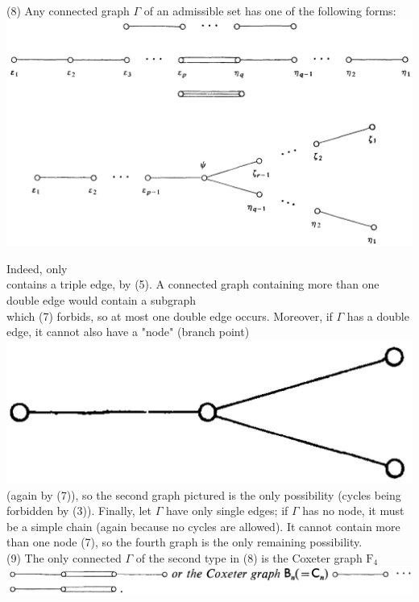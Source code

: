 \documentclass[10pt]{article}
\begin{document}
(8) Any connected graph $\Gamma$ of an admissible set has one of the following forms:\\
\includegraphics[max width=\textwidth, center]{2025_06_06_fac2836a92464059da43g-074(2)}

Indeed, only\\
contains a triple edge, by (5). A connected graph containing more than one double edge would contain a subgraph\\
which (7) forbids, so at most one double edge occurs. Moreover, if $\Gamma$ has a double edge, it cannot also have a "node" (branch point)\\
\includegraphics[max width=\textwidth, center]{2025_06_06_fac2836a92464059da43g-075}\\
(again by (7)), so the second graph pictured is the only possibility (cycles being forbidden by (3)). Finally, let $\Gamma$ have only single edges; if $\Gamma$ has no node, it must be a simple chain (again because no cycles are allowed). It cannot contain more than one node (7), so the fourth graph is the only remaining possibility.\\
(9) The only connected $\Gamma$ of the second type in (8) is the Coxeter graph $\mathrm{F}_{4}$\\
\includegraphics[max width=\textwidth, center]{2025_06_06_fac2836a92464059da43g-075(1)}
\end{document}
